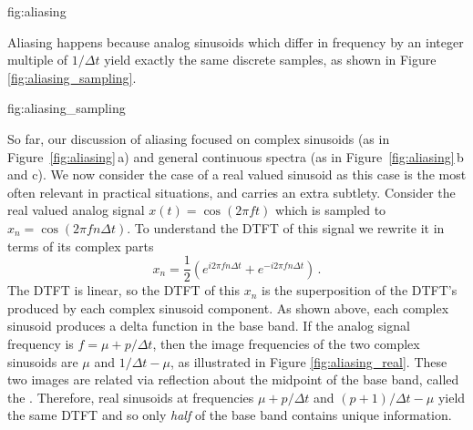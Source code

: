 {fig:aliasing}

Aliasing happens because analog sinusoids which differ in frequency by an integer multiple of $1/\Delta t$ yield exactly the same discrete samples, as shown in Figure \ref{fig:aliasing_sampling}.

{fig:aliasing_sampling}

So far, our discussion of aliasing focused on complex sinusoids (as in Figure~\ref{fig:aliasing}\,a) and general continuous spectra (as in Figure~\ref{fig:aliasing}\,b and c).
We now consider the case of a real valued sinusoid as this case is the most often relevant in practical situations, and carries an extra subtlety.
Consider the real valued analog signal $x(t) = \cos(2 \pi f t)$ which is sampled to $x_n = \cos(2 \pi f n \Delta t)$.
To understand the DTFT of this signal we rewrite it in terms of its complex parts
\begin{equation}
x_n = \frac{1}{2} \left( e^{i 2 \pi f n \Delta t} + e^{-i 2 \pi f n \Delta t} \right) \, .
\end{equation}
The DTFT is linear, so the DTFT of this $x_n$ is the superposition of the DTFT's produced by each complex sinusoid component.
As shown above, each complex sinusoid produces a delta function in the base band.
If the analog signal frequency is $f = \mu + p/\Delta t$, then the image frequencies of the two complex sinusoids are $\mu$ and $1/\Delta t - \mu$, as illustrated in Figure \ref{fig:aliasing_real}.
These two images are related via reflection about the midpoint of the base band, called the .
Therefore, real sinusoids at frequencies $\mu + p/\Delta t$ and $(p+1)/\Delta t - \mu$ yield the same DTFT and so only \emph{half} of the base band contains unique information.

